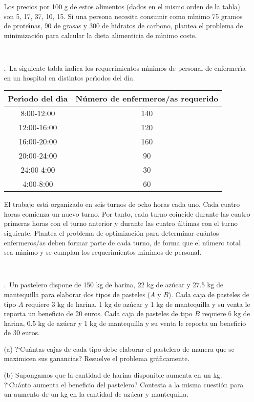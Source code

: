 \documentclass[11pt,a4paper,twoside]{article}
\newcounter{problem} \setcounter{problem}{1}
\newcommand{\ex}{\noindent {\sf \bf \theproblem}\addtocounter{problem}{1}.\ }
\begin{document}
Los precios por 100 g de estos alimentos (dados en el mismo orden
de la tabla) son 5, 17, 37, 10, 15. Si una persona necesita
consumir como m\'{\i}nimo 75 gramos de prote\'{\i}nas, 90 de grasas y 300 de
hidratos de carbono, plantea el problema de minimizaci\'on  para
calcular la dieta alimenticia de m\'{\i}nimo coste.

\

\ex La siguiente tabla indica los requerimientos
m\'{\i}nimos de personal de enfermer\'{\i}a en un hospital en distintos
per\'{\i}odos del d\'{\i}a.



\begin{center}  \begin{tabular}{c|c}
 Per\'{\i}odo del d\'{\i}a&N\'umero de enfermeros/as requerido\\ \hline
8:00-12:00&140\\ 12:00-16:00&120\\ 16:00-20:00&160\\
20:00-24:00&90\\ 24:00-4:00&30\\ 4:00-8:00&60\\ 
\end{tabular}
\end{center}



El trabajo est\'a organizado en se\-is tur\-nos de ocho ho\-ras
ca\-da uno. Ca\-da cua\-tro ho\-ras co\-mien\-za un nue\-vo turno.
Por tanto, cada turno coincide durante las cuatro primeras horas
con el turno anterior y durante las cuatro \'ultimas con el turno
siguiente. Plantea el problema de optimizaci\'on para determinar
cu\'antos enfermeros/as deben formar parte de cada turno, de forma
que el n\'umero total sea m\'{\i}nimo y  se cumplan los requerimientos
m\'{\i}nimos de personal.

\


\ex Un pastelero dispone de 150 kg de harina, 22 kg de az\'ucar y 27.5
 kg de mantequilla para elaborar dos tipos de pasteles ($A$ y
 $B$). Cada caja de pasteles de tipo $A$ requiere 3 kg de harina,
 1 kg de az\'ucar y 1 kg de mantequilla y su venta le reporta un
 beneficio de 20 euros. Cada caja de pasteles
  de tipo $B$ requiere 6 kg de harina,
 0.5 kg de az\'ucar y 1 kg de mantequilla y su venta le reporta un
 beneficio de 30 euros.
 \begin{compactitem}
 \item[(a)] ?`Cu\'antas cajas de cada
 tipo debe elaborar el pastelero de manera que se maximicen sus
 ganancias? Resuelve el problema gr\'aficamente.
 \item [(b)] Supongamos que la
 cantidad de harina disponible aumenta en un kg. ?`Cu\'anto aumenta
 el beneficio del pastelero? Contesta a la misma cuesti\'on para un
 aumento de un kg en la cantidad de az\'ucar y mantequilla.
 \end{compactitem}
 
\end{document}
